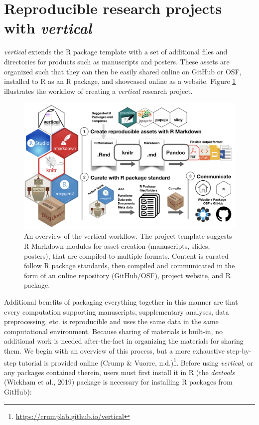 \documentclass[
  english,
  jou,floatsintext]{apa6}
\begin{document}
\hypertarget{reproducible-research-projects-with-vertical}{%
\section{\texorpdfstring{Reproducible research projects with \emph{vertical}}{Reproducible research projects with vertical}}\label{reproducible-research-projects-with-vertical}}

\emph{vertical} extends the R package template with a set of additional files and directories for products such as manuscripts and posters. These assets are organized such that they can then be easily shared online on GitHub or OSF, installed to R as an R package, and showcased online as a website. Figure \ref{fig:vertical-workflow} illustrates the workflow of creating a \emph{vertical} research project.

\begin{figure}

{\centering \includegraphics[width=\textwidth]{images/vertical-workflow} 

}

\caption{An overview of the vertical workflow. The project template suggests R Markdown modules for asset creation (manuscripts, slides, posters), that are compiled to multiple formats. Content is curated follow R package standards, then compiled and communicated in the form of an online repository (GitHub/OSF), project website, and R package.}\label{fig:vertical-workflow}
\end{figure}

Additional benefits of packaging everything together in this manner are that every computation supporting manuscripts, supplementary analyses, data preprocessing, etc. is reproducible and uses the same data in the same computational environment. Because sharing of materials is built-in, no additional work is needed after-the-fact in organizing the materials for sharing them. We begin with an overview of this process, but a more exhaustive step-by-step tutorial is provided online (Crump \& Vuorre, n.d.)\footnote{\url{https://crumplab.github.io/vertical}}. Before using \emph{vertical}, or any packages contained therein, users must first install it in R (the \emph{devtools} (Wickham et al., 2019) package is necessary for installing R packages from GitHub):
\end{document}
